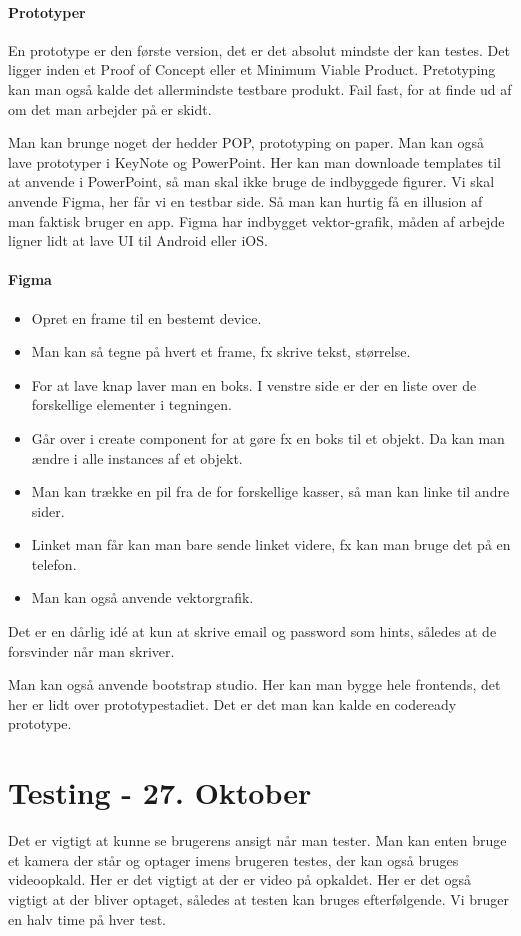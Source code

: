 \documentclass{article}
\begin{document}
\paragraph{Prototyper}
En prototype er den første version, det er det absolut mindste der kan testes.
Det ligger inden et Proof of Concept eller et Minimum Viable Product.
Pretotyping kan man også kalde det allermindste testbare produkt. Fail fast, for
at finde ud af om det man arbejder på er skidt.

Man kan brunge noget der hedder POP, prototyping on paper. Man kan også lave
prototyper i KeyNote og PowerPoint. Her kan man downloade templates til at
anvende i PowerPoint, så man skal ikke bruge de indbyggede figurer.
Vi skal anvende Figma, her får vi en testbar side. Så man kan hurtig få en
illusion af man faktisk bruger en app. Figma har indbygget vektor-grafik, måden
af arbejde ligner lidt at lave UI til Android eller iOS.

\paragraph{Figma}
\begin{itemize}
  \item Opret en frame til en bestemt device.
  \item Man kan så tegne på hvert et frame, fx skrive tekst, størrelse.
  \item For at lave knap laver man en boks. I venstre side er der en liste over
    de forskellige elementer i tegningen.
  \item Går over i create component for at gøre fx en boks til et objekt. Da kan
    man ændre i alle instances af et objekt.
  \item Man kan trække en pil fra de for forskellige kasser, så man kan linke
    til andre sider.
  \item Linket man får kan man bare sende linket videre, fx kan man bruge det på
    en telefon.
  \item Man kan også anvende vektorgrafik.
\end{itemize}

Det er en dårlig idé at kun at skrive email og password som hints, således at de
forsvinder når man skriver.

Man kan også anvende bootstrap studio. Her kan man bygge hele frontends, det her
er lidt over prototypestadiet. Det er det man kan kalde en codeready prototype.



\newpage
\section{Testing - 27. Oktober} 
Det er vigtigt at kunne se brugerens ansigt når man tester. Man kan enten bruge
et kamera der står og optager imens brugeren testes, der kan også bruges
videoopkald. Her er det vigtigt at der er video på opkaldet. Her er det også
vigtigt at der bliver optaget, således at testen kan bruges efterfølgende.
Vi bruger en halv time på hver test. 
\end{document}
